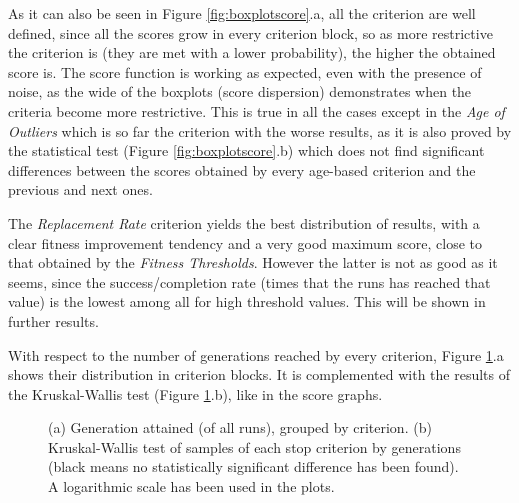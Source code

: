 \documentclass[runningheads,a4paper]{llncs}
\begin{document}
As it can also be seen in Figure \ref{fig:boxplotscore}.a, all the criterion are well defined, since all the scores grow in every criterion block, so as more restrictive the criterion is (they are met with a lower probability), the higher the obtained score is. The score function is working as expected, even with the presence of noise, as the wide of the boxplots (score dispersion) demonstrates when the criteria become more restrictive. This is true in all the cases except in the \textit{Age of Outliers} which is so far the criterion with the worse results, as it is also proved by the statistical test (Figure \ref{fig:boxplotscore}.b) which does not find significant differences between the scores obtained by every age-based criterion and the previous and next ones.

The \textit{Replacement Rate} criterion yields the best distribution of results, with a clear fitness improvement tendency and a very good maximum score, close to that obtained by the \textit{Fitness Thresholds}. However the latter is not as good as it seems, since the success/completion rate (times that the runs has reached that value) is the lowest among all for high threshold values. This will be shown in further results.

With respect to the number of generations reached by every criterion, Figure \ref{fig:boxplotgenerations}.a shows their distribution in criterion blocks. It is complemented with the results of the Kruskal-Wallis test (Figure \ref{fig:boxplotgenerations}.b), like in the score graphs.

\begin{figure}[h!tb]
\begin{center}
\end{center} 
\caption{(a) Generation attained (of all runs), grouped by criterion. (b) Kruskal-Wallis test of samples of each stop criterion by generations (black means no statistically significant difference has been found). A logarithmic scale has been used in the plots.}
\label{fig:boxplotgenerations}
\end{figure}
\end{document}
